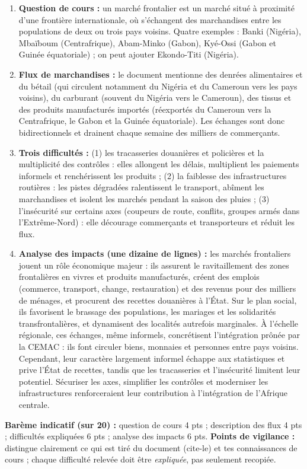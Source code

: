 \documentclass[11pt]{article}
\newcommand{\cle}[1]{{\popxbold\color{popdark}#1}}
\begin{document}
\begin{corrige}
\begin{enumerate}
\item \textbf{Question de cours :} un \cle{marché frontalier} est un marché situé à proximité d'une frontière internationale, où s'échangent des marchandises entre les populations de deux ou trois pays voisins. Quatre exemples : Banki (Nigéria), Mbaïboum (Centrafrique), Abam-Minko (Gabon), Kyé-Ossi (Gabon et Guinée équatoriale) ; on peut ajouter Ekondo-Titi (Nigéria).
\item \textbf{Flux de marchandises :} le document mentionne des denrées alimentaires et du bétail (qui circulent notamment du Nigéria et du Cameroun vers les pays voisins), du carburant (souvent du Nigéria vers le Cameroun), des tissus et des produits manufacturés importés (réexportés du Cameroun vers la Centrafrique, le Gabon et la Guinée équatoriale). Les échanges sont donc bidirectionnels et drainent chaque semaine des milliers de commerçants.
\item \textbf{Trois difficultés :} (1) les tracasseries douanières et policières et la multiplicité des contrôles : elles allongent les délais, multiplient les paiements informels et renchérissent les produits ; (2) la faiblesse des infrastructures routières : les pistes dégradées ralentissent le transport, abîment les marchandises et isolent les marchés pendant la saison des pluies ; (3) l'insécurité sur certains axes (coupeurs de route, conflits, groupes armés dans l'Extrême-Nord) : elle décourage commerçants et transporteurs et réduit les flux.
\item \textbf{Analyse des impacts (une dizaine de lignes) :} les marchés frontaliers jouent un rôle économique majeur : ils assurent le ravitaillement des zones frontalières en vivres et produits manufacturés, créent des emplois (commerce, transport, change, restauration) et des revenus pour des milliers de ménages, et procurent des recettes douanières à l'État. Sur le plan social, ils favorisent le brassage des populations, les mariages et les solidarités transfrontalières, et dynamisent des localités autrefois marginales. À l'échelle régionale, ces échanges, même informels, concrétisent l'intégration prônée par la CEMAC : ils font circuler biens, monnaies et personnes entre pays voisins. Cependant, leur caractère largement informel échappe aux statistiques et prive l'État de recettes, tandis que les tracasseries et l'insécurité limitent leur potentiel. Sécuriser les axes, simplifier les contrôles et moderniser les infrastructures renforceraient leur contribution à l'intégration de l'Afrique centrale.
\end{enumerate}
\textbf{Barème indicatif (sur 20) :} question de cours 4 pts ; description des flux 4 pts ; difficultés expliquées 6 pts ; analyse des impacts 6 pts.
\textbf{Points de vigilance :} distingue clairement ce qui est tiré du document (cite-le) et tes connaissances de cours ; chaque difficulté relevée doit être \emph{expliquée}, pas seulement recopiée.
\end{corrige}
\end{document}
